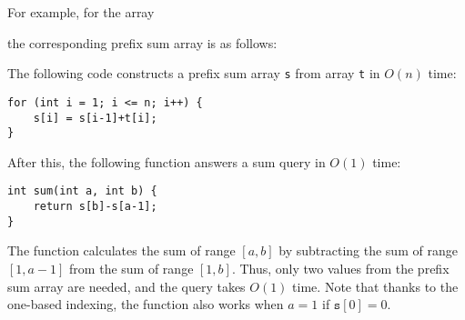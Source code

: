 For example, for the array
\begin{center}
\end{center}
the corresponding prefix sum array is as follows:
\begin{center}
\end{center}
The following code constructs a prefix sum
array \texttt{s} from array \texttt{t} in $O(n)$ time:
\begin{lstlisting}
for (int i = 1; i <= n; i++) {
    s[i] = s[i-1]+t[i];
}
\end{lstlisting}
After this, the following function answers
a sum query in $O(1)$ time:
\begin{lstlisting}
int sum(int a, int b) {
    return s[b]-s[a-1];
}
\end{lstlisting}

The function calculates the sum of range $[a,b]$
by subtracting the sum of range $[1,a-1]$
from the sum of range $[1,b]$.
Thus, only two values from the prefix sum array
are needed, and the query takes $O(1)$ time.
Note that thanks to the one-based indexing,
the function also works when $a=1$ if $\texttt{s}[0]=0$. 

